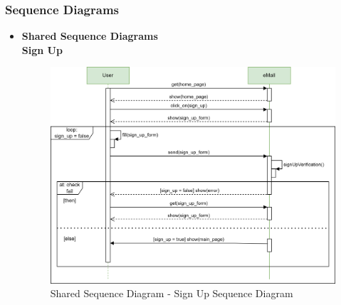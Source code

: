 \documentclass[table, 12pt]{article} %
\begin{document}
        \newpage
        \subsubsection{Sequence Diagrams} \label{sequencediagram} 
        \begin{itemize}
            \item \textbf{Shared Sequence Diagrams}\\
            
            \textbf{Sign Up}
            \begin{center}
                \begin{figure}[H]
                    \includegraphics[scale=0.55, center]{assets/sequenceDiagrams/Sign up sequence.png}
                    \caption{Shared Sequence Diagram - Sign Up Sequence Diagram}
                    \label{fig: sequence_signup}
                \end{figure}
            \end{center}


\end{itemize}
\end{document}
